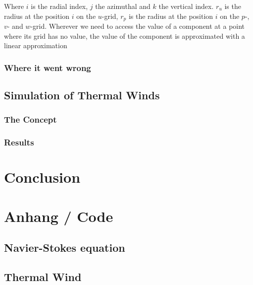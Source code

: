 \documentclass[12pt, a4paper, twoside]{article}
\begin{document}
			Where $i$ is the radial index, $j$ the azimuthal and $k$ the vertical index. $r_u$ is the radius at the position $i$ on the $u$-grid, $r_p$ is the radius at the position $i$ on the $p$-, $v$- and $w$-grid.
			Wherever we need to access the value of a component at a point where its grid has no value, the value of the component is approximated with a linear approximation
			
		\subsubsection{Where it went wrong}
	
	\subsection{Simulation of Thermal Winds}
		\subsubsection{The Concept}
		\subsubsection{Results}

	\newpage
\section{Conclusion}

	\newpage
\section{Anhang / Code}
	\subsection{Navier-Stokes equation}
	\subsection{Thermal Wind}
\pagebreak
\end{document}
